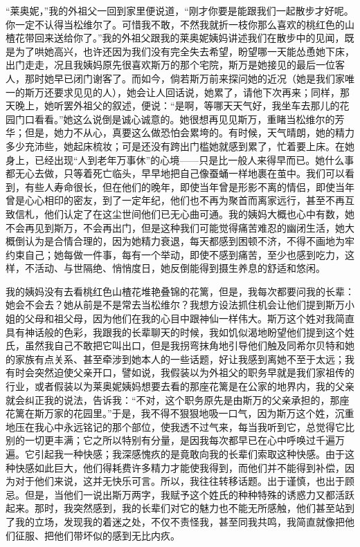 \par “莱奥妮，”我的外祖父一回到家里便说道，“刚才你要是能跟我们一起散步才好呢。你一定不认得当松维尔了。可惜我不敢，不然我就折一枝你那么喜欢的桃红色的山楂花带回来送给你了。”我的外祖父跟我的莱奥妮姨妈讲述我们在散步中的见闻，既是为了哄她高兴，也许还因为我们没有完全失去希望，盼望哪一天能怂恿她下床，出门走走，况且我姨妈原先很喜欢斯万的那个宅院，斯万是她接见的最后一位客人，那时她早已闭门谢客了。而如今，倘若斯万前来探问她的近况（她是我们家唯一的斯万还要求见见的人），她会让人回话说，她累了，请他下次再来；同样，那天晚上，她听罢外祖父的叙述，便说：“是啊，等哪天天气好，我坐车去那儿的花园门口看看。”她这么说倒是诚心诚意的。她很想再见见斯万，重睹当松维尔的芳华；但是，她力不从心，真要这么做恐怕会累垮的。有时候，天气晴朗，她的精力多少充沛些，她起床梳妆；可是还没有跨出门槛她就感到累了，忙着要上床。在她身上，已经出现“人到老年万事休”的心境——只是比一般人来得早而已。她什么事都无心去做，只等着死亡临头，早早地把自己像蚕蛹一样地裹在茧中。我们可以看到，有些人寿命很长，但在他们的晚年，即使当年曾是形影不离的情侣，即使当年曾是心心相印的密友，到了一定年纪，他们也不再为聚首而离家远行，甚至不再互致信札，他们认定了在这尘世间他们已无心曲可通。我的姨妈大概也心中有数，她不会再见到斯万，不会再出门，但是这种我们可能觉得痛苦难忍的幽闭生活，她大概倒认为是合情合理的，因为她精力衰退，每天都感到困顿不济，不得不画地为牢约束自己；她每做一件事，每有一个举动，即使不感到痛苦，至少也感到吃力，这样，不活动、与世隔绝、悄悄度日，她反倒能得到摄生养息的舒适和悠闲。
\par 我的姨妈没有去看桃红色山楂花堆艳叠锦的花篱，但是，我每次都要问我的长辈：她会不会去？她从前是不是常去当松维尔？我想方设法抓住机会让他们提到斯万小姐的父母和祖父母，因为他们在我的心目中跟神仙一样伟大。斯万这个姓对我简直具有神话般的色彩，我跟我的长辈聊天的时候，我如饥似渴地盼望他们提到这个姓氏，虽然我自己不敢把它叫出口，但是我拐弯抹角地引导他们触及同希尔贝特和她的家族有点关系、甚至牵涉到她本人的一些话题，好让我感到离她不至于太远；我有时会突然迫使父亲开口，譬如说，我假装以为外祖父的职务早就是我们家祖传的行业，或者假装以为莱奥妮姨妈想要去看的那座花篱是在公家的地界内，我的父亲就会纠正我的说法，告诉我：“不对，这个职务原先是由斯万的父亲承担的，那座花篱在斯万家的花园里。”于是，我不得不狠狠地吸一口气，因为斯万这个姓，沉重地压在我心中永远铭记的那个部位，使我透不过气来，每当我听到它，总觉得它比别的一切更丰满；它之所以特别有分量，是因我每次都早已在心中呼唤过千遍万遍。它引起我一种快感；我深感愧疚的是竟敢向我的长辈们索取这种快感。由于这种快感如此巨大，他们得耗费许多精力才能使我得到，而他们并不能得到补偿，因为对于他们来说，这并无快乐可言。所以，我往往转移话题。出于谨慎，也出于顾忌。但是，当他们一说出斯万两字，我赋予这个姓氏的种种特殊的诱惑力又都活跃起来。那时，我突然感到，我的长辈们对它的魅力也不能无所感触，他们甚至站到了我的立场，发现我的着迷之处，不仅不责怪我，甚至同我共鸣，我简直就像把他们征服、把他们带坏似的感到无比内疚。
